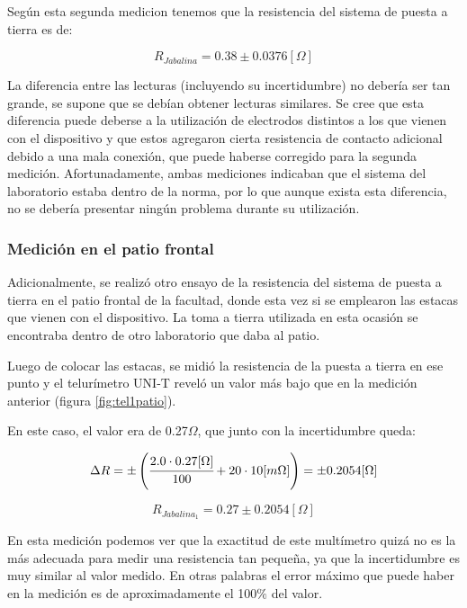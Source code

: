 Según esta segunda medicion tenemos que la resistencia del sistema de puesta a tierra es de:

\begin{equation*}
    R_{Jabalina} = 0.38 \pm 0.0376 [\Omega]
\end{equation*}

La diferencia entre las lecturas (incluyendo su incertidumbre) no debería ser tan grande, se supone que se debían obtener lecturas similares. Se cree que esta diferencia puede deberse a la utilización de electrodos distintos a los que vienen con el dispositivo y que estos agregaron cierta resistencia de contacto adicional debido a una mala conexión, que puede haberse corregido para la segunda medición. Afortunadamente, ambas mediciones indicaban que el sistema del laboratorio estaba dentro de la norma, por lo que aunque exista esta diferencia, no se debería presentar ningún problema durante su utilización.

\subsubsection{Medición en el patio frontal}

Adicionalmente, se realizó otro ensayo de la resistencia del sistema de puesta a tierra en el patio frontal de la facultad, donde esta vez si se emplearon las estacas que vienen con el dispositivo. La toma a tierra utilizada en esta ocasión se encontraba dentro de otro laboratorio que daba al patio.



Luego de colocar las estacas, se midió la resistencia de la puesta a tierra en ese punto y el telurímetro UNI-T reveló un valor más bajo que en la medición anterior (figura \ref{fig:tel1patio}). 

En este caso, el valor era de 0.27$\Omega$, que junto con la incertidumbre queda:

\begin{equation*}
    \Delta R = \pm \left( \cfrac{2.0 \cdot 0.27 [\Omega]}{100} + 20 \cdot 10 [m\Omega] \right) = \pm 0.2054 [\Omega]    
\end{equation*}

\begin{equation*}
    R_{Jabalina_1} = 0.27 \pm 0.2054 [\Omega]
\end{equation*}

En esta medición podemos ver que la exactitud de este multímetro quizá no es la más adecuada para medir una resistencia tan pequeña, ya que la incertidumbre es muy similar al valor medido. En otras palabras el error máximo que puede haber en la medición es de aproximadamente el 100$\%$ del valor. 

